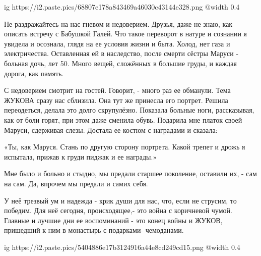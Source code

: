 \begin{multicols}{2}

\ifcmt
  ig https://i2.paste.pics/68807e178a843469a46030c43144e328.png
  @width 0.4
\fi

Не раздражайтесь на нас гневом и недоверием. Друзья, даже не знаю, как описать
встречу с Бабушкой Галей.  Что такое переворот  в натуре и сознании я увидела и
осознала, глядя на ее условия жизни и быта. Холод, нет газа и электричества.
Оставленная ей в наследство, после смерти сёстры Маруси - больная дочь, лет 50.
Много вещей, сложённых в большие груды, и каждая дорога, как память.

С недоверием смотрит на гостей. Говорит, - много раз ее обманули.  Тема ЖУКОВА
сразу нас сблизила. Она тут же принесла его портрет. Решила переодеться, делала
это долго скрупулёзно.  Показала больные ноги,  рассказывая, как от боли горят,
при этом даже сменила обувь.  Подарила мне платок своей  Маруси, сдерживая
слезы.  Достала ее костюм с наградами и сказала: 

«Ты, как Маруся. Стань по другую сторону портрета.  Какой трепет и дрожь я
испытала, прижав к груди  пиджак и ее награды.»

Мне было и больно и стыдно, мы предали старшее поколение, оставили их, - сам на
сам.  Да, впрочем мы предали и самих себя. 

У неё трезвый ум и надежда - крик души  для нас, что, если не струсим, то
победим.  Для неё сегодня, происходящее,- это война с коричневой чумой.
Главные и лучшие дни  ее воспоминаний - это конец войны и ЖУКОВ, пришедший к
ним в монастырь с подарками- чемоданами. 

\ifcmt
  ig https://i2.paste.pics/5404886e17b3124916a44e8cd249cd15.png
  @width 0.4
\fi


\end{multicols}
